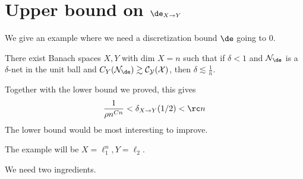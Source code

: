 

\section{Upper bound on $\de_{X\to Y}$}

We give an example where we need a discretization bound $\de$ going to 0.

\begin{thm}\label{thm:1/n}
There exist Banach spaces $X, Y$ with dim $X = n$ such that if $\delta < 1$ and $\cal N_\de$ is a $\delta$-net in the unit ball and
$C_Y(\cal N_\de) \gtrsim C_Y(X)$, then $\delta \lesssim \frac{1}{n}$. 
\end{thm}
Together with the lower bound we proved, this gives
\[
\frac{1}{\rho n^{Cn}} < \delta_{X \to Y}(1/2) < \rc n
\]
The lower bound  would be most interesting to improve. 
 
The example will be $X = \ell_1^n, Y = \ell_2$. %

We need two ingredients.

